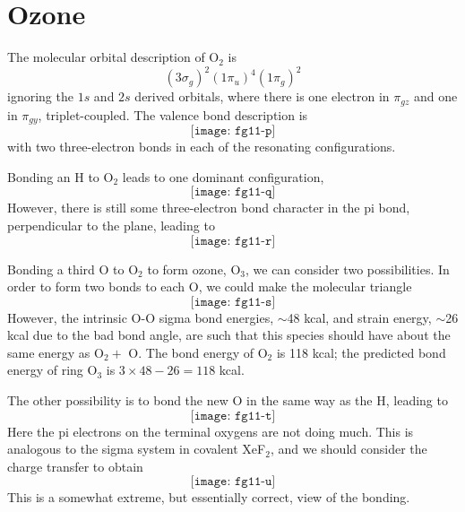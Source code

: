 \section{Ozone}

The molecular orbital description of O$_2$ is
\begin{equation}
( 3 \sigma_g )^2 (1 \pi_u )^4 (1 \pi_g )^2
\end{equation}
ignoring the $1s$ and $2s$ derived orbitals, where there is one electron in 
$\pi_{gz}$ and one in $\pi_{gy}$, triplet-coupled.  The valence bond 
description is
\begin{equation}
\texttt{[image: fg11-p]}
\end{equation}
with two three-electron bonds in each of the resonating configurations.

Bonding an H to O$_2$ leads to one dominant configuration,
\begin{equation}
\texttt{[image: fg11-q]}
\end{equation}
However, there is still some three-electron bond character in the pi 
bond, perpendicular to the plane, leading to
\begin{equation}
\texttt{[image: fg11-r]}
\end{equation}

Bonding a third O to O$_2$ to form ozone, O$_3$, we can consider two 
possibilities.  In order to form two bonds to each O, we could make the 
molecular triangle
\begin{equation}
\texttt{[image: fg11-s]}
\end{equation}
However, the intrinsic O-O sigma bond energies, $\sim$48 kcal, and strain 
energy, $\sim$26 kcal due to the bad bond angle, are such that this 
species should have about the same energy as O$_2 +$ O.  The bond energy 
of O$_2$ is 118 kcal; the predicted bond energy of ring O$_3$ 
is $3 \times 48 - 26 = 118$ kcal.

The other possibility is to bond the new O in the same way as the H, 
leading to
\begin{equation}
\texttt{[image: fg11-t]}
\end{equation}
Here the pi electrons on the terminal oxygens are not doing much. This is 
analogous to the sigma system in covalent XeF$_2$, and we should consider 
the charge transfer to obtain
\begin{equation}
\texttt{[image: fg11-u]}
\end{equation}
This is a somewhat extreme, but essentially correct, view of the bonding.

